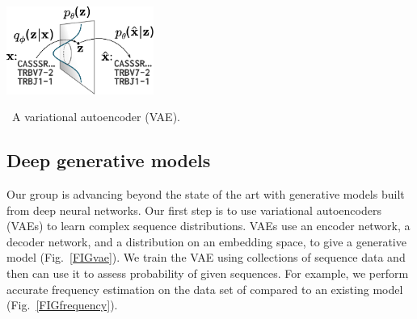 \documentclass[nobib]{tufte-handout}
\begin{document}
\begin{marginfigure}[-1.5in]%
\begin{centering}
    \includegraphics[width=1.9in]{figures/vae.pdf}
\end{centering}
  \caption{\
    A variational autoencoder (VAE).
    }
  \label{FIGvae}
\end{marginfigure}%



\subsection*{Deep generative models}
Our group is advancing beyond the state of the art with generative models built from deep neural networks.
Our first step is to use variational autoencoders (VAEs) \cite{Kingma2014-mo} to learn complex sequence distributions.
VAEs use an encoder network, a decoder network, and a distribution on an embedding space, to give a generative model (Fig.~\ref{FIGvae}).
We train the VAE using collections of sequence data and then can use it to assess probability of given sequences.
For example, we perform accurate frequency estimation on the data set of \cite{Emerson2017-co} compared to an existing model (Fig.~\ref{FIGfrequency}).
\end{document}
